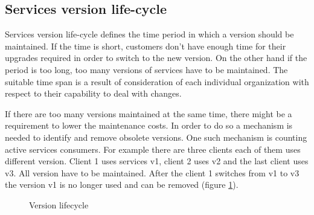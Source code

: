\subsection{Services version life-cycle}
Services version life-cycle defines the time period in which a version should be maintained. If the time is short, customers don't have enough time for their upgrades required in order to switch to the new version. On the other hand if the period is too long, too many versions of services have to be maintained. The suitable time span is a result of consideration of each individual organization with respect to their capability to deal with changes.

If there are too many versions maintained at the same time, there might be a requirement to lower the maintenance costs. In order to do so a mechanism is needed to identify and remove obsolete versions. One such mechanism is counting active services consumers. For example there are three clients each of them uses different version. Client 1 uses services v1, client 2 uses v2 and the last client uses v3. All version have to be maintained. After the client 1 switches from v1 to v3 the version v1 is no longer used and can be removed (figure \ref{fig:version-life-cycle}).

\begin{figure}[htp] 
\caption{Version lifecycle}
\label{fig:version-life-cycle}
\end{figure} 




